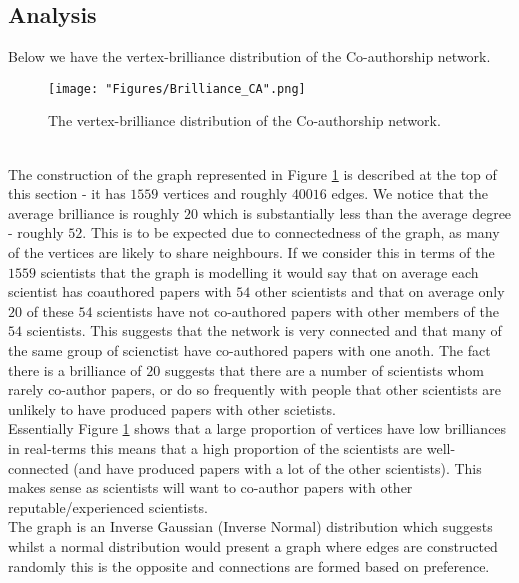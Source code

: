 \documentclass[12pt, a4paper]{article}
\begin{document}
\subsection*{Analysis}
Below we have the vertex-brilliance distribution of the Co-authorship network.\\
 \begin{figure}[!htb]
     \centering
     \texttt{[image: "Figures/Brilliance\_CA".png]}
     \caption{The vertex-brilliance distribution of the Co-authorship network.}
     \label{Fig:ca_brill}
\end{figure}
\\
The construction of the graph represented in Figure \ref{Fig:ca_brill} is described at the top of this section - it has $1559$ vertices and roughly $40016$ edges. We notice that the average brilliance is roughly $20$ which is substantially less than the average degree - roughly $52$. This is to be expected due to connectedness of the graph, as many of the vertices are likely to share neighbours. If we consider this in terms of the $1559$ scientists that the graph is modelling it would say that on average each scientist has coauthored papers with $54$ other scientists and that on average only $20$ of these $54$ scientists have not co-authored papers with other members of the $54$ scientists. This suggests that the network is very connected and that many of the same group of scienctist have co-authored papers with one anoth. The fact there is a brilliance of $20$ suggests that there are a number of scientists whom rarely co-author papers, or do so frequently with people that other scientists are unlikely to have produced papers with other scietists.\\ Essentially Figure \ref{Fig:ca_brill} shows that a large proportion of vertices have low brilliances in real-terms this means that a high proportion of the scientists are well-connected (and have produced papers with a lot of the other scientists). This makes sense as scientists will want to co-author papers with other reputable/experienced scientists.\\
The graph is an Inverse Gaussian (Inverse Normal) distribution which suggests whilst a normal distribution would present a graph where edges are constructed randomly this is the opposite and connections are formed based on preference.
\newpage
\end{document}
